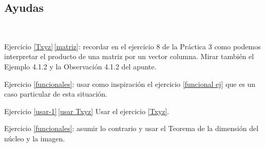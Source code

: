 \documentclass[a4paper,12pt,twoside,spanish,reqno]{amsbook}
\numberwithin{equation}{section}
\begin{document}
\subsection*{Ayudas}

\

    Ejercicio \ref{Txyz}\,\ref{matriz}: recordar en el ejercicio 8 de la Práctica 3 como podemos interpretar el producto de una matriz por un vector columna. Mirar también el Ejemplo 4.1.2 y la Observación 4.1.2 del apunte.

    Ejercicio \ref{funcionales}: usar como inspiración el ejercicio     \ref{funcional ej} que es un caso particular de esta situación.

    Ejercicio \ref{usar-1}\,\ref{usar Txyz} Usar el ejercicio     \ref{Txyz}.

    Ejercicio \ref{funcionales}: asumir lo contrario y usar el Teorema de la dimensión del núcleo y la imagen.





\end{document}
